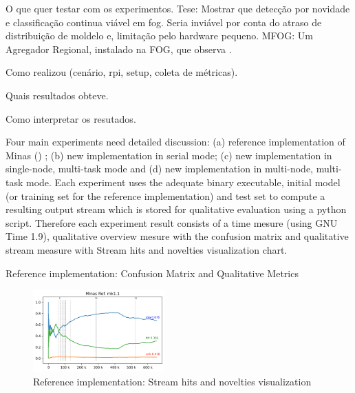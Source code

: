 \documentclass[conference]{IEEEtran}
\begin{document}

O que quer testar com os experimentos.
  Tese: Mostrar que detecção por novidade e classificação continua viável em fog.
  Seria inviável por conta do atraso de distribuição de moldelo e,
  limitação pelo hardware pequeno.
  MFOG: Um Agregador Regional, instalado na FOG, que observa .

Como realizou (cenário, rpi, setup, coleta de métricas).

Quais resultados obteve.

Como interpretar os resutados.

Four main experiments need detailed discussion:
(a) reference implementation of Minas () \cite{Faria2016minas};
(b) new implementation in serial mode;
(c) new implementation in single-node, multi-task mode and
(d) new implementation in multi-node, multi-task mode.
Each experiment uses the adequate binary executable, initial model
(or training set for the reference implementation) and test set
to compute a resulting output stream which is stored for qualitative evaluation
using a python script.
Therefore each experiment result consists of a time mesure (using GNU Time 1.9),
qualitative overview mesure with the confusion matrix and
qualitative stream measure with Stream hits and novelties visualization chart.

\begin{table}
    \caption{Reference implementation: Confusion Matrix and Qualitative Metrics}
    
    \label{fig:java-matrix}
\end{table}
\begin{figure}[htbp]
  \centerline{\includegraphics[width=0.45\textwidth]{../experiments/revised-java.log.png}}
  \caption{Reference implementation: Stream hits and novelties visualization}
  \label{fig:java-hits}
\end{figure}
\end{document}
